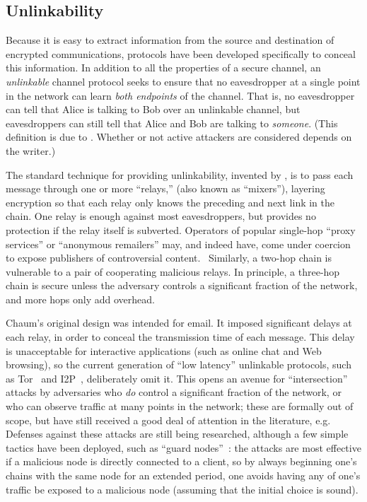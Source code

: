 \documentclass[oneside]{zarticle}
\begin{document}
\subsection{Unlinkability}

Because it is easy to extract information from the source and
destination of encrypted communications, protocols have been developed
specifically to conceal this information.  In addition to all the
properties of a secure channel, an \emph{unlinkable} channel protocol
seeks to ensure that no eavesdropper at a single point in the network
can learn \emph{both endpoints} of the channel.  That is, no
eavesdropper can tell that Alice is talking to Bob over an unlinkable
channel, but eavesdroppers can still tell that Alice and Bob are
talking to \emph{someone}.  (This definition is due to
\textcite{pfitzmann2010terminology}.  Whether or not active attackers
are considered depends on the writer.)

The standard technique for providing unlinkability, invented by
\textcite{chaum1981mix}, is to pass each message through one or more
“relays,” (also known as “mixers”), layering encryption so that each
relay only knows the preceding and next link in the chain. One relay
is enough against most eavesdroppers, but provides no protection if
the relay itself is subverted.  Operators of popular single-hop “proxy
services” or “anonymous remailers” may, and indeed have, come under
coercion to expose publishers of controversial
content.~\cite{newman1996church, singel2007hushmail,
  ackerman2013lavabit} Similarly, a two-hop chain is vulnerable to a
pair of cooperating malicious relays.  In principle, a three-hop chain
is secure unless the adversary controls a significant fraction of the
network, and more hops only add overhead.~\cite{wright2002analysis,
  wright2003defending}

Chaum's original design was intended for email. It imposed significant
delays at each relay, in order to conceal the transmission time of
each message.  This delay is unacceptable for interactive applications
(such as online chat and Web browsing), so the current generation of
“low latency” unlinkable protocols, such as
Tor~\cite{dingledine2004tor} and I2P~\cite{i2p.undated.i2p},
deliberately omit it.  This opens an avenue for “intersection” attacks
by adversaries who \emph{do} control a significant fraction of the
network, or who can observe traffic at many points in the network;
these are formally out of scope, but have still received a good deal
of attention in the literature, e.g.~\cite{danezis2003statistical,
  danezis2004continuous, danezis2005statistical, danezis2007twosided,
  murdoch2007sampled, shmatikov2006timing, overlier2006locating}
Defenses against these attacks are still being researched, although a
few simple tactics have been deployed, such as “guard
nodes”~\cite{overlier2006locating}: the attacks are most effective if
a malicious node is directly connected to a client, so by always
beginning one's chains with the same node for an extended period, one
avoids having any of one's traffic be exposed to a malicious node
(assuming that the initial choice is sound).
\end{document}
